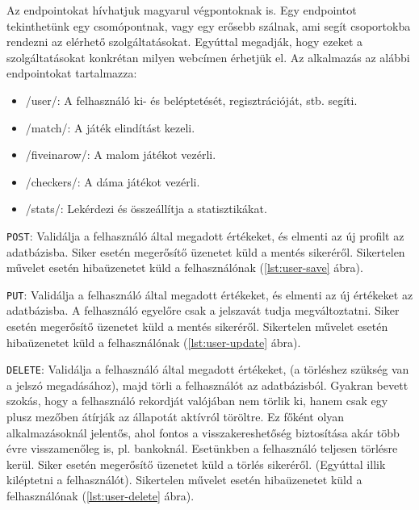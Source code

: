 Az endpointokat hívhatjuk magyarul végpontoknak is. Egy endpointot tekinthetünk egy csomópontnak, vagy egy erősebb szálnak, ami segít csoportokba rendezni az elérhető szolgáltatásokat. Egyúttal megadják, hogy ezeket a szolgáltatásokat konkrétan milyen webcímen érhetjük el. Az alkalmazás az alábbi endpointokat tartalmazza:
\begin{itemize}
	\item /user/: A felhasználó ki- és beléptetését, regisztrációját, stb. segíti.
	\item /match/: A játék elindítást kezeli.
	\item /fiveinarow/: A malom játékot vezérli.
	\item /checkers/: A dáma játékot vezérli.
	\item /stats/: Lekérdezi és összeállítja a statisztikákat.
\end{itemize}



\texttt{POST}: Validálja a felhasználó által megadott értékeket, és elmenti az új profilt az adatbázisba.
Siker esetén megerősítő üzenetet küld a mentés sikeréről.
Sikertelen művelet esetén hibaüzenetet küld a felhasználónak (\ref{lst:user-save} ábra).



\texttt{PUT}: Validálja a felhasználó által megadott értékeket, és elmenti az új értékeket az adatbázisba. A felhasználó egyelőre csak a jelszavát tudja megváltoztatni.
Siker esetén megerősítő üzenetet küld a mentés sikeréről.
Sikertelen művelet esetén hibaüzenetet küld a felhasználónak (\ref{lst:user-update} ábra).



\texttt{DELETE}: Validálja a felhasználó által megadott értékeket, (a törléshez szükség van a jelszó megadásához), majd törli a felhasználót az adatbázisból. Gyakran bevett szokás, hogy a felhasználó rekordját valójában nem törlik ki, hanem csak egy plusz mezőben átírják az állapotát aktívról töröltre. Ez főként olyan alkalmazásoknál jelentős, ahol fontos a visszakereshetőség biztosítása akár több évre visszamenőleg is, pl. bankoknál. Esetünkben a felhasználó teljesen törlésre kerül.
Siker esetén megerősítő üzenetet küld a törlés sikeréről. (Egyúttal illik kiléptetni a felhasználót).
Sikertelen művelet esetén hibaüzenetet küld a felhasználónak (\ref{lst:user-delete} ábra).

